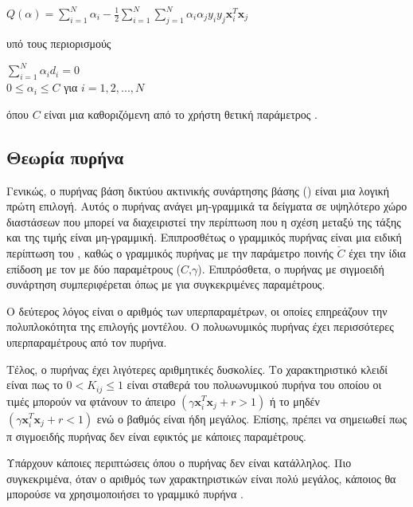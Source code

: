 \begin{center}
$Q(\alpha)=\sum_{i=1}^N\alpha_i-\frac{1}{2}\sum_{i=1}^N\sum_{j=1}^N\alpha_i\alpha_jy_iy_j\mathbf{x}_i^T\mathbf{x}_j$
\end{center}
υπό τους περιορισμούς
\begin{center}
$\sum_{i=1}^N\alpha_i d_i=0$\\
$0 \leq \alpha_i \leq C$ για $i=1,2, ...,N$\\
\end{center}
όπου $C$ είναι μια καθοριζόμενη από το χρήστη θετική παράμετρος \cite{haykin}.
\subsection{Θεωρία πυρήνα }
Γενικώς, ο πυρήνας βάση δικτύου ακτινικής συνάρτησης βάσης () είναι μια λογική πρώτη επιλογή. Αυτός ο πυρήνας ανάγει μη-γραμμικά τα δείγματα σε υψηλότερο χώρο διαστάσεων που μπορεί να διαχειριστεί την περίπτωση που η σχέση μεταξύ της τάξης και της τιμής είναι μη-γραμμική. Επιπροσθέτως ο γραμμικός πυρήνας είναι μια ειδική περίπτωση του , καθώς ο γραμμικός πυρήνας με την παράμετρο ποινής $\check{C}$ έχει την ίδια επίδοση με τον  με δύο παραμέτρους ($C$,$\gamma$). Επιπρόσθετα, ο πυρήνας με σιγμοειδή συνάρτηση συμπεριφέρεται όπως με  για συγκεκριμένες παραμέτρους.\par
Ο δεύτερος λόγος είναι ο αριθμός των υπερπαραμέτρων, οι οποίες επηρεάζουν την πολυπλοκότητα της επιλογής μοντέλου. Ο πολυωνυμικός πυρήνας έχει περισσότερες υπερπαραμέτρους από τον  πυρήνα.\par
Τέλος, ο πυρήνας  έχει λιγότερες αριθμητικές δυσκολίες. Το χαρακτηριστικό κλειδί είναι πως το $0<K_{ij}\leq1$ είναι σταθερά του πολυωνυμικού πυρήνα του οποίου οι τιμές μπορούν να φτάνουν το άπειρο $(\gamma\mathbf{x}_i^T\mathbf{x}_j+r>1)$ ή το μηδέν $(\gamma\mathbf{x}_i^T\mathbf{x}_j+r<1)$ ενώ ο βαθμός είναι ήδη μεγάλος. Επίσης, πρέπει να σημειωθεί πως π σιγμοειδής πυρήνας δεν είναι εφικτός με κάποιες παραμέτρους.\par
Υπάρχουν κάποιες περιπτώσεις όπου ο πυρήνας  δεν είναι κατάλληλος. Πιο συγκεκριμένα, όταν ο αριθμός των χαρακτηριστικών είναι πολύ μεγάλος, κάποιος θα μπορούσε να χρησιμοποιήσει το γραμμικό πυρήνα \cite{libsvmguide}.
